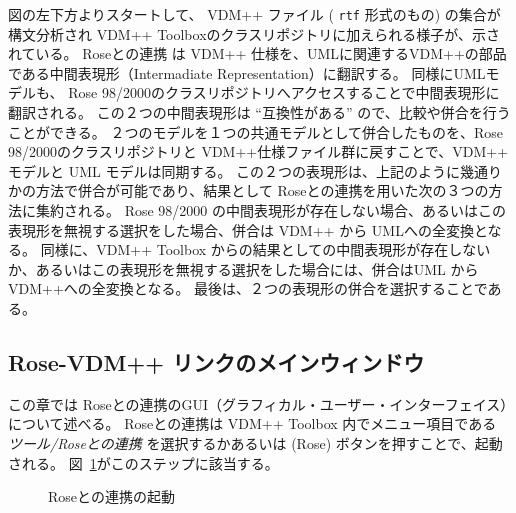 \documentclass[\pformat,12pt]{jarticle}
\newcommand{\vdmpp}{VDM++}
\newcommand{\link}{Roseとの連携}
\newcommand{\rose}{Rose 98/2000}
\newcommand{\guicmd}[1]{{\sf #1}}
\begin{document}
図の左下方よりスタートして、 \vdmpp{} ファイル ( {\tt rtf} 形式のもの) の集合が構文分析され \vdmpp{} Toolboxのクラスリポジトリに加えられる様子が、示されている。
 \link{} は \vdmpp{} 仕様を、UMLに関連する\vdmpp{}の部品である中間表現形（Intermadiate Representation）に翻訳する。
同様にUMLモデルも、 \rose{}のクラスリポジトリへアクセスすることで中間表現形に翻訳される。
この２つの中間表現形は ``互換性がある'' ので、比較や併合を行うことができる。
２つのモデルを１つの共通モデルとして併合したものを、\rose{}のクラスリポジトリと \vdmpp{}仕様ファイル群に戻すことで、\vdmpp{} モデルと UML モデルは同期する。
この２つの表現形は、上記のように幾通りかの方法で併合が可能であり、結果として \link{}を用いた次の３つの方法に集約される。
 \rose{} の中間表現形が存在しない場合、あるいはこの表現形を無視する選択をした場合、併合は \vdmpp{} から UMLへの全変換となる。
同様に、\vdmpp{} Toolbox からの結果としての中間表現形が存在しないか、あるいはこの表現形を無視する選択をした場合には、併合はUML から \vdmpp{}への全変換となる。
最後は、２つの表現形の併合を選択することである。

\subsection{Rose-VDM++ リンクのメインウィンドウ} \label{main}

この章では \link{}のGUI（グラフィカル・ユーザー・インターフェイス）について述べる。
\link{}は \vdmpp{} Toolbox 内でメニュー項目である {\it ツール/\link{}} を選択するかあるいは (\guicmd{Rose}) ボタンを押すことで、起動される。
図~\ref{fig:toolbox}がこのステップに該当する。

\begin{figure}[htb]
\begin{center}
\mbox{}
\caption{\link{}の起動\label{fig:toolbox}}
\end{center}
\end{figure}
\end{document}
